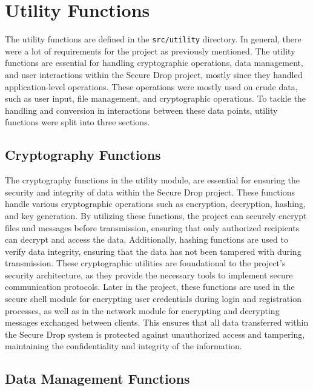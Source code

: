\documentclass[12pt]{article}
\begin{document}
\section{Utility Functions}
The utility functions are defined in the \texttt{src/utility} directory. In general, there were a lot of requirements for the project as previously mentioned.
The utility functions are essential for handling cryptographic operations, data management, and user interactions within the Secure Drop project, mostly since they handled application-level operations.
These operations were mostly used on crude data, such as user input, file management, and cryptographic operations. To tackle the handling and conversion in interactions between these data points, utility functions were split into three sections.

\subsection{Cryptography Functions}


The cryptography functions in the utility module, are essential for ensuring the security and integrity of data within the Secure Drop project. These functions handle various cryptographic operations such as encryption, decryption, hashing, and key generation. By utilizing these functions, the project can securely encrypt files and messages before transmission, ensuring that only authorized recipients can decrypt and access the data. Additionally, hashing functions are used to verify data integrity, ensuring that the data has not been tampered with during transmission. These cryptographic utilities are foundational to the project's security architecture, as they provide the necessary tools to implement secure communication protocols. Later in the project, these functions are used in the secure shell module for encrypting user credentials during login and registration processes, as well as in the network module for encrypting and decrypting messages exchanged between clients. This ensures that all data transferred within the Secure Drop system is protected against unauthorized access and tampering, maintaining the confidentiality and integrity of the information.

\subsection{Data Management Functions}

\end{document}
